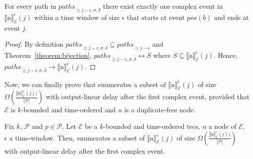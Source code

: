 \begin{lemma}\label{lemma:bijection_subpath}
  For every path in ${paths}_{\ge j-\epsilon, \sigma, \delta}$ there exist exactly one complex event in ${\llbracket \text{n} \rrbracket}^{\epsilon}_{\mathcal{E}}(j)$ within a time window of size $\epsilon$ that starts at event $pos(b)$ and ends at event $j$.
\end{lemma}

\begin{proof}
  By definition ${paths}_{\ge j-\epsilon, \sigma, \delta} \subseteq {paths}_{\ge j-\epsilon}$ and Theorem~\ref{theorem:bijection}, ${paths}_{\ge j-\epsilon, \sigma, \delta} \longleftrightarrow S$ where $S \subseteq {\llbracket \text{n} \rrbracket}^{\epsilon}_{\mathcal{E}}(j)$. Hence, ${paths}_{\ge j-\epsilon, \sigma, \delta} \rightarrow {\llbracket \text{n} \rrbracket}^{\epsilon}_{\mathcal{E}}(j)$.
\end{proof}

Now, we can finally prove that  enumerates a subset of ${\llbracket \text{n} \rrbracket}^{\epsilon}_{\mathcal{E}}(j)$ of size $\Omega(\frac{{\llbracket \text{n} \rrbracket}^{\epsilon}_{\mathcal{E}}(j))}{|\mathcal{P}|})$ with output-linear delay after the first complex event, provided that $\mathcal{E}$ is $k$-bounded and time-ordered and $n$ is a duplicate-free node.

\begin{theorem}\label{theorem:enumeration:process}
  Fix $k$, $\mathcal{P}$ and $p \in \mathcal{P}$. Let $\mathcal{E}$ be a $k$-bounded and time-ordered \acrshort{tecs}, $n$ a node of $\mathcal{E}$, $\epsilon$ a time-window. Then,  enumerates a subset of ${\llbracket \text{n} \rrbracket}^{\epsilon}_{\mathcal{E}}(j)$ of size $\Omega(\frac{{\llbracket \text{n} \rrbracket}^{\epsilon}_{\mathcal{E}}(j))}{|\mathcal{P}|})$ with output-linear delay after the first complex event.
\end{theorem}

